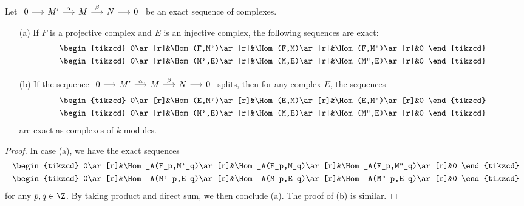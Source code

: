 \begin{proposition}\label{module complex Hom complex exactness}
Let $\begin{tikzcd}[column sep=5mm]
0\ar[r]&M'\ar[r,"\alpha"]&M\ar[r,"\beta"]&N\ar[r]&0
\end{tikzcd}$ be an exact sequence of complexes.
\begin{itemize}
\item[(a)] If $F$ is a projective complex and $E$ is an injective complex, the following sequences are exact:
\begin{equation*}
\begin{aligned}
\begin{tikzcd}
0\ar[r]&\Hom(F,M')\ar[r]&\Hom(F,M)\ar[r]&\Hom(F,M'')\ar[r]&0
\end{tikzcd}\\
\begin{tikzcd}
0\ar[r]&\Hom(M',E)\ar[r]&\Hom(M,E)\ar[r]&\Hom(M'',E)\ar[r]&0
\end{tikzcd}
\end{aligned}
\end{equation*}
\item[(b)] If the sequence $\begin{tikzcd}[column sep=5mm]
0\ar[r]&M'\ar[r,"\alpha"]&M\ar[r,"\beta"]&N\ar[r]&0
\end{tikzcd}$ splits, then for any complex $E$, the sequences
 \begin{equation*}
\begin{aligned}
\begin{tikzcd}
0\ar[r]&\Hom(E,M')\ar[r]&\Hom(E,M)\ar[r]&\Hom(E,M'')\ar[r]&0
\end{tikzcd}\\
\begin{tikzcd}
0\ar[r]&\Hom(M',E)\ar[r]&\Hom(M,E)\ar[r]&\Hom(M'',E)\ar[r]&0
\end{tikzcd}
\end{aligned}
\end{equation*}
are exact as complexes of $k$-modules.
\end{itemize}
\end{proposition}
\begin{proof}
In case (a), we have the exact sequences
\begin{equation*}
\begin{aligned}
\begin{tikzcd}
0\ar[r]&\Hom_A(F_p,M'_q)\ar[r]&\Hom_A(F_p,M_q)\ar[r]&\Hom_A(F_p,M''_q)\ar[r]&0
\end{tikzcd}\\
\begin{tikzcd}
0\ar[r]&\Hom_A(M'_p,E_q)\ar[r]&\Hom_A(M_p,E_q)\ar[r]&\Hom_A(M''_p,E_q)\ar[r]&0
\end{tikzcd}
\end{aligned}
\end{equation*}
for any $p,q\in\Z$. By taking product and direct sum, we then conclude (a). The proof of (b) is similar.
\end{proof}
